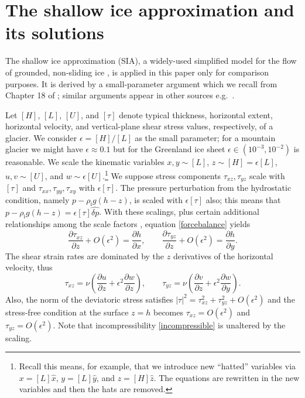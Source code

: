 \documentclass[letterpaper,final,12pt,reqno]{amsart}
\newcommand{\eps}{\epsilon}
\newcommand{\rhoi}{\rho_{\text{i}}}
\begin{document}
\section{The shallow ice approximation and its solutions}

The shallow ice approximation (SIA), a widely-used simplified model for the flow of grounded, non-sliding ice \cite{SchoofHewitt2013}, is applied in this paper only for comparison purposes.  It is derived by a small-parameter argument which we recall from Chapter 18 of \cite{Fowler1997}; similar arguments appear in other sources e.g.~\cite{GreveBlatter2009}.

Let $[H]$, $[L]$, $[U]$, and $[\tau]$ denote typical thickness, horizontal extent, horizontal velocity, and vertical-plane shear stress values, respectively, of a glacier.  We consider $\eps = [H]/[L]$ as the small parameter; for a mountain glacier we might have $\eps \approx 0.1$ but for the Greenland ice sheet $\eps \in (10^{-3},10^{-2})$ is reasonable.  We scale the kinematic variables $x,y \sim [L]$, $z \sim [H] = \eps [L]$, $u,v \sim [U]$, and $w \sim \eps [U]$.\footnote{Recall this means, for example, that we introduce new ``hatted'' variables via $x=[L]\hat x$, $y=[L]\hat y$, and $z=[H] \hat z$.  The equations are rewritten in the new variables and then the hats are removed.}  We suppose stress components $\tau_{xz},\tau_{yz}$ scale with $[\tau]$ and $\tau_{xx},\tau_{yy},\tau_{xy}$ with $\eps[\tau]$.   The pressure perturbation from the hydrostatic condition, namely $p-\rhoi g (h - z)$, is scaled with $\eps [\tau]$ also; this means that $p-\rhoi g (h - z)=\eps[\tau]\hat{\delta p}$.  With these scalings, plus certain additional relationships among the scale factors \cite{Fowler1997}, equation \eqref{forcebalance} yields
    $$\frac{\partial\tau_{xz}}{\partial z} + O(\eps^2) = \frac{\partial h}{\partial x}, \qquad \frac{\partial\tau_{yz}}{\partial z} + O(\eps^2) = \frac{\partial h}{\partial y}.$$
The shear strain rates are dominated by the $z$ derivatives of the horizontal velocity, thus
    $$\tau_{xz} = \nu\left(\frac{\partial u}{\partial z} + \eps^2 \frac{\partial w}{\partial z}\right), \qquad \tau_{yz} = \nu\left(\frac{\partial v}{\partial z} + \eps^2 \frac{\partial w}{\partial y}\right).$$
Also, the norm of the deviatoric stress satisfies $|\tau|^2 = \tau_{xz}^2 + \tau_{yz}^2 + O(\eps^2)$ and the stress-free condition at the surface $z=h$ becomes $\tau_{xz} = O(\eps^2)$ and $\tau_{yz} = O(\eps^2)$.  Note that incompressibility \eqref{incompressible} is unaltered by the scaling.
\end{document}
